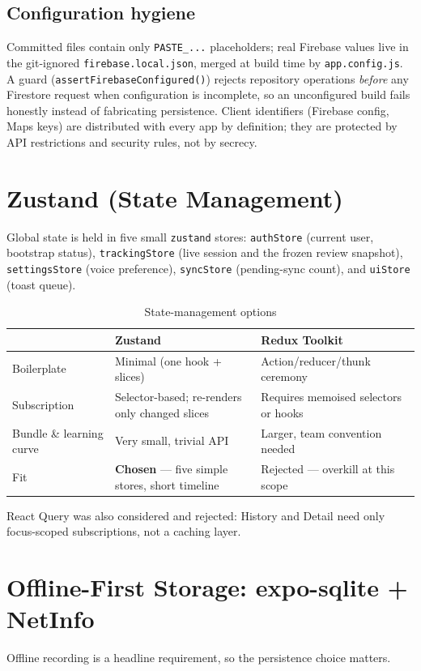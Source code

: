 \documentclass[12pt, a4paper]{report}
\newcommand{\pkg}[1]{\texttt{#1}}
\newcommand{\code}[1]{\texttt{#1}}
\begin{document}
\subsection{Configuration hygiene}
Committed files contain only \code{PASTE\_...} placeholders; real Firebase
values live in the git-ignored \code{firebase.local.json}, merged at build
time by \code{app.config.js}. A guard (\code{assertFirebaseConfigured()})
rejects repository operations \emph{before} any Firestore request when
configuration is incomplete, so an unconfigured build fails honestly instead
of fabricating persistence. Client identifiers (Firebase config, Maps keys)
are distributed with every app by definition; they are protected by API
restrictions and security rules, not by secrecy.

\section{Zustand (State Management)}
Global state is held in five small \pkg{zustand} stores: \code{authStore}
(current user, bootstrap status), \code{trackingStore} (live session and the
frozen review snapshot), \code{settingsStore} (voice preference),
\code{syncStore} (pending-sync count), and \code{uiStore} (toast queue).

\begin{table}[H]
\centering
\caption{State-management options}
\label{tab:state}
\small
\begin{tabularx}{\textwidth}{@{}l L L@{}}
\toprule
 & \textbf{Zustand} & \textbf{Redux Toolkit} \\
\midrule
Boilerplate & Minimal (one hook + slices) & Action/reducer/thunk ceremony \\
Subscription & Selector-based; re-renders only changed slices & Requires
  memoised selectors or hooks \\
Bundle \& learning curve & Very small, trivial API & Larger, team convention
  needed \\
Fit & \textbf{Chosen} --- five simple stores, short timeline &
  Rejected --- overkill at this scope \\
\bottomrule
\end{tabularx}
\end{table}

\noindent React Query was also considered and rejected: History and Detail
need only focus-scoped subscriptions, not a caching layer.

\section{Offline-First Storage: expo-sqlite + NetInfo}
Offline recording is a headline requirement, so the persistence choice matters.
\end{document}
